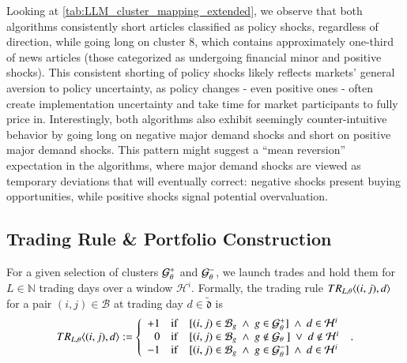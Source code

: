 Looking at \cref{tab:LLM_cluster_mapping_extended}, we observe that both algorithms consistently short articles classified as policy shocks, regardless of direction, while going long on cluster 8, which contains approximately one-third of news articles (those categorized as undergoing financial minor and positive shocks). This consistent shorting of policy shocks likely reflects markets' general aversion to policy uncertainty, as policy changes - even positive ones - often create implementation uncertainty and take time for market participants to fully price in. Interestingly, both algorithms also exhibit seemingly counter-intuitive behavior by going long on negative major demand shocks and short on positive major demand shocks. This pattern might suggest a ``mean reversion'' expectation in the algorithms, where major demand shocks are viewed as temporary deviations that will eventually correct: negative shocks present buying opportunities, while positive shocks signal potential overvaluation.

\subsection{Trading Rule \& Portfolio Construction}
\hspace{0.5cm}For a given selection of clusters $\G_{\theta}^+$ and $\G_{\theta}^-$, we launch trades and hold them for $L\in\mathbb{N}$ trading days over a window $\mathcal H^i$.
%
Formally, the trading rule $TR_{{{L}},\theta}\angl{(i,j),d}$ for a pair $(i,j)\in\mathcal{B}$ at trading day ${d}\in\tilde{\mathfrak d}$ is 
%
\begin{align*}
TR_{{{L}},\theta}\angl{(i,j),{d}} := \mycases{rllllll}{
+1
&\IF 
&
[
(i,j)\in\mathcal{B}_g
~\wedge~
g \in \G_{\theta}^+
]
~\wedge~
{d}\in \mathcal H^i
\\
0
&\IF
&
[
(i,j)\in\mathcal{B}_g
~\wedge~
g \not\in \G_\theta ~
]
~\vee~
{d}
\not\in \mathcal H^i
\\
-1
&\IF 
&
[
(i,j)\in\mathcal{B}_g
~\wedge~
g \in \G_{\theta}^-
]
~\wedge~
{d}
\in \mathcal H^i
}
~.
\end{align*}

